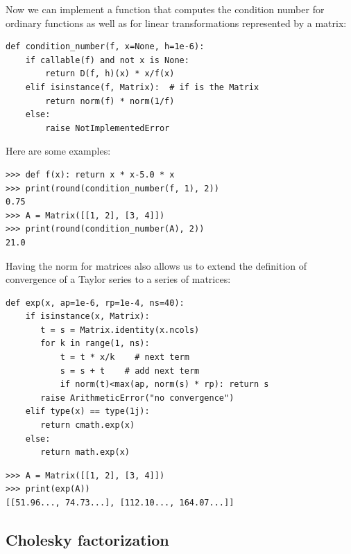 \documentclass[justified, sixbynine]{tufte-book}
\def\ft{\small\tt}
\theoremstyle{plain}%
\newtheorem * {corollary}{Corollary}
\theoremstyle{definition}
\theoremstyle{remark}
\newtheorem * {remark}{Remark}
\newtheorem * {note}{Note}
\begin{document}
\begin{fullwidth}
Now we can implement a function that computes the condition number for ordinary functions as well as for linear transformations represented by a matrix:

\begin{lstlisting}[caption={in file: {\ft nlib.py}}]
def condition_number(f, x=None, h=1e-6):
    if callable(f) and not x is None:
        return D(f, h)(x) * x/f(x)
    elif isinstance(f, Matrix):  # if is the Matrix
        return norm(f) * norm(1/f)
    else:
        raise NotImplementedError
\end{lstlisting}

Here are some examples:

\begin{lstlisting}[caption={in file: {\ft nlib.py}}]
>>> def f(x): return x * x-5.0 * x
>>> print(round(condition_number(f, 1), 2))
0.75
>>> A = Matrix([[1, 2], [3, 4]])
>>> print(round(condition_number(A), 2))
21.0
\end{lstlisting}


Having the norm for matrices also allows us to extend the definition of convergence of a Taylor series to a series of matrices:

\begin{lstlisting}[caption={in file: {\ft nlib.py}}]
def exp(x, ap=1e-6, rp=1e-4, ns=40):
    if isinstance(x, Matrix):
       t = s = Matrix.identity(x.ncols)
       for k in range(1, ns):
           t = t * x/k    # next term
           s = s + t    # add next term
           if norm(t)<max(ap, norm(s) * rp): return s
       raise ArithmeticError("no convergence")
    elif type(x) == type(1j):
       return cmath.exp(x)
    else:
       return math.exp(x)
\end{lstlisting}

\begin{lstlisting}[caption={in file: {\ft nlib.py}}]
>>> A = Matrix([[1, 2], [3, 4]])
>>> print(exp(A))
[[51.96..., 74.73...], [112.10..., 164.07...]]
\end{lstlisting}

\goodbreak\subsection{Cholesky factorization}



\end{fullwidth}
\end{document}
